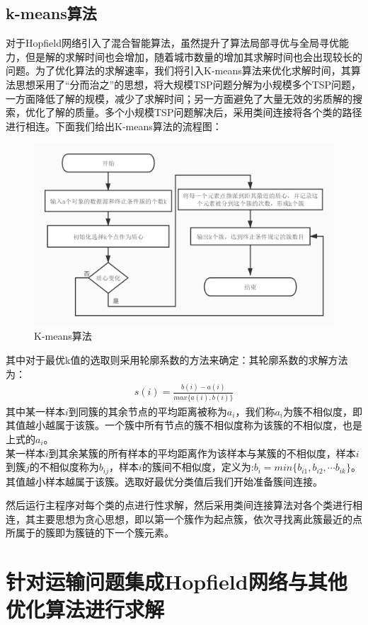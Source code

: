 \subsection{k-means算法}
对于Hopfield网络引入了混合智能算法，虽然提升了算法局部寻优与全局寻优能力，但是解的求解时间也会增加，随着城市数量的增加其求解时间也会出现较长的问题。为了优化算法的求解速率，我们将引入K-means算法来优化求解时间，其算法思想采用了“分而治之”的思想，将大规模TSP问题分解为小规模多个TSP问题，一方面降低了解的规模，减少了求解时间；另一方面避免了大量无效的劣质解的搜索，优化了解的质量。多个小规模TSP问题解决后，采用类间连接将各个类的路径进行相连。下面我们给出K-means算法的流程图：
\begin{figure}[H]
    \centering
    \includegraphics[width=13cm]{figure/kmeans.jpg}%
    \caption{K-means算法}
    \label{fig:kmeans}
\end{figure}
其中对于最优k值的选取则采用轮廓系数的方法来确定：其轮廓系数的求解方法为：
\begin{align}
    s(i) = \frac{b(i)-a(i)}{max\{a(i), b(i)\}}
\end{align}
其中某一样本$i$到同簇的其余节点的平均距离被称为$a_i$，我们称$a_i$为簇不相似度，即其值越小越属于该簇。一个簇中所有节点的簇不相似度称为该簇的不相似度，也是上式的$a_i$。\\
某一样本$i$到其余某簇的所有样本的平均距离作为该样本与某簇的不相似度，样本$i$到簇$j$的不相似度称为$b_{ij}$，样本$i$的簇间不相似度，定义为:$b_i = min\{b_{i1},b_{i2}, \cdots b_{ik}\}$。其值越小样本越属于该簇。选取好最优分类值后我们开始准备簇间连接。
\par
然后运行主程序对每个类的点进行性求解，然后采用类间连接算法对各个类进行相连，其主要思想为贪心思想，即以第一个簇作为起点簇，依次寻找离此簇最近的点所属于的簇即为簇链的下一个簇元素。
\section{针对运输问题集成Hopfield网络与其他优化算法进行求解}
